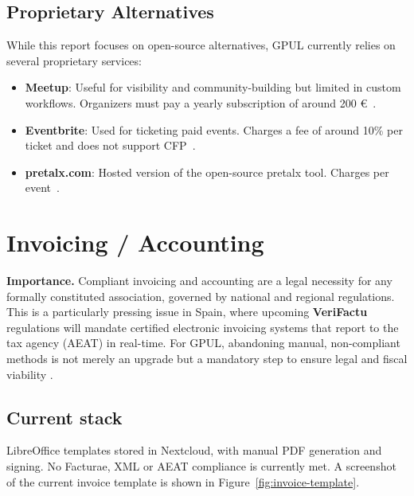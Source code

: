 \subsection*{Proprietary Alternatives}
While this report focuses on open-source alternatives, GPUL currently relies on several proprietary services:

\begin{itemize}
  \item \textbf{Meetup}: Useful for visibility and community-building but limited in custom workflows. Organizers must pay a yearly subscription of around 200 €~\cite{meetup-wiki}.
  \item \textbf{Eventbrite}: Used for ticketing paid events. Charges a fee of around 10\% per ticket and does not support CFP~\cite{eventbrite-wiki}.
  \item \textbf{pretalx.com}: Hosted version of the open-source pretalx tool. Charges per event~\cite{pretalx-pricing}.
\end{itemize}

\section{Invoicing / Accounting}

\textbf{Importance.} Compliant invoicing and accounting are a legal necessity for any formally constituted association, governed by national and regional regulations. This is a particularly pressing issue in Spain, where upcoming \textbf{VeriFactu} regulations will mandate certified electronic invoicing systems that report to the tax agency (AEAT) in real-time. For GPUL, abandoning manual, non-compliant methods is not merely an upgrade but a mandatory step to ensure legal and fiscal viability \cite{odoo-blog-verifactu}.

\subsection*{Current stack}
LibreOffice templates stored in Nextcloud, with manual PDF generation and signing. No Facturae, XML or AEAT compliance is currently met. A screenshot of the current invoice template is shown in Figure~\ref{fig:invoice-template}.

